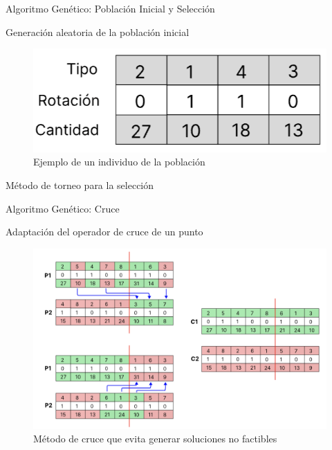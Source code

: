 \documentclass[handout]{beamer}
\begin{document}
\begin{frame}{Algoritmo Genético: Población Inicial y Selección}
    \begin{exampleblock}{Generación aleatoria de la población inicial}
        \vspace{1cm}
        \begin{figure}
            \centering
            \includegraphics[width=.5\textwidth]{pic/codificacion.png}
            \caption*{Ejemplo de un individuo de la población}
            \label{fig:individuo}
        \end{figure}
    \end{exampleblock}
    \begin{exampleblock}{Método de torneo para la selección}
    \end{exampleblock}
\end{frame}

\begin{frame}{Algoritmo Genético: Cruce}
    \begin{exampleblock}{Adaptación del operador de cruce de un punto}
        \begin{figure}
            \centering
            \includegraphics[width=.75\textwidth]{pic/ag-cruce.png}
            \caption*{Método de cruce que evita generar soluciones no factibles}
            \label{fig:solucion}
        \end{figure}
    \end{exampleblock}
\end{frame}
\end{document}
